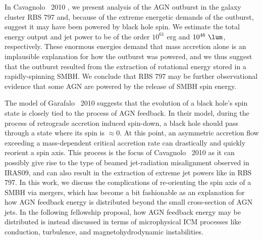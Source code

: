\documentclass[letterpaper,12pt]{article}
\begin{document}
In Cavagnolo \etal\ 2010 \citep{r797}, we present analysis of the AGN
outburst in the galaxy cluster RBS 797 and, because of the extreme
energetic demands of the outburst, suggest it may have been powered by
black hole spin. We estimate the total energy output and jet power to
be of the order $10^{61}$ erg and $10^{46} ~\lum$, respectively. These
enormous energies demand that mass accretion alone is an implausible
explanation for how the outburst was powered, and we thus suggest that
the outburst resulted from the extraction of rotational energy stored
in a rapidly-spinning SMBH. We conclude that RBS 797 may be further
observational evidence that some AGN are powered by the release of
SMBH spin energy.

The model of Garafalo \etal\ 2010 \citep{gesspin} suggests that the
evolution of a black hole's spin state is closely tied to the
process of AGN feedback. In their model, during the process of
retrograde accretion induced spin-down, a black hole should pass
through a state where its spin is $\approx 0$. At this point, an
asymmetric accretion flow exceeding a mass-dependent critical
accretion rate can drastically and quickly reorient a spin axis. This
process is the focus of Cavagnolo \etal\ 2010 \citep{spinaxis} as it
can possibly give rise to the type of beamed jet-radiation
misalignment observed in IRAS09, and can also result in the extraction
of extreme jet powers like in RBS 797. In this work, we discuss the
complications of re-orienting the spin axis of a SMBH via mergers,
which has become a bit fashionable as an explanation for how AGN
feedback energy is distributed beyond the small cross-section of AGN
jets. In the following fellowship proposal, how AGN feedback energy
may be distributed is instead discussed in terms of microphysical ICM
processes like conduction, turbulence, and magnetohydrodynamic
instabilities.
\end{document}
